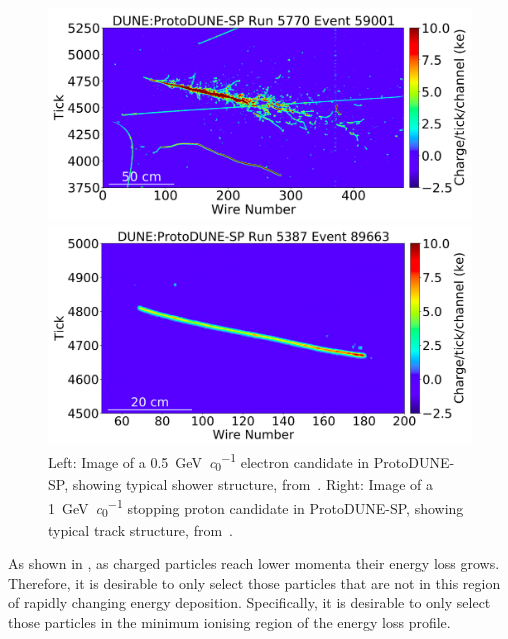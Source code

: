 \begin{figure}[h]
	\begin{minipage}[t]{.49\linewidth}
		\includegraphics[width=\linewidth]{files/figures/protodune_calibration/showerCand}
	\end{minipage}
	\hfill
	\begin{minipage}[t]{.49\linewidth}
		\includegraphics[width=\linewidth]{files/figures/protodune_calibration/trackCand}		
	\end{minipage}
	\caption[Images of typical track and shower structures in ProtoDUNE-SP]{Left: Image of a \SI{0.5}{\GeV\per\clight} electron candidate in ProtoDUNE-SP, showing typical shower structure, from~\cite{protodunePerformance}. Right: Image of a \SI{1}{\GeV\per\clight} stopping proton candidate in ProtoDUNE-SP, showing typical track structure, from~\cite{protodunePerformance}.}
	\label{fig:trackShower}
\end{figure}

As shown in , as charged particles reach lower momenta their energy loss grows.
Therefore, it is desirable to only select those particles that are not in this region of rapidly changing energy deposition.
Specifically, it is desirable to only select those particles in the minimum ionising region of the energy loss profile.

